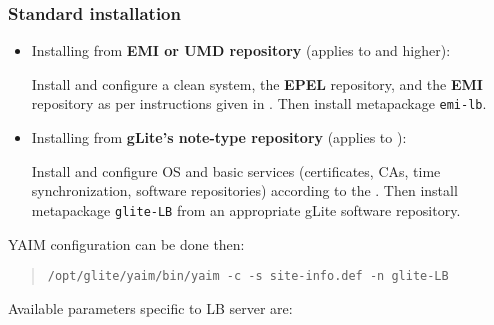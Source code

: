 \subsubsection{Standard installation}

\begin{itemize}
\item Installing from \textbf{EMI or UMD repository} (applies to  and higher):

Install and configure a clean system, the \textbf{EPEL} repository, and the \textbf{EMI} repository as per instructions given in . Then install metapackage \texttt{emi-lb}.

\item Installing from \textbf{gLite's note-type repository} (applies to ):

Install and configure OS and basic services (certificates, CAs, time synchronization, software repositories) according to the . Then install metapackage \texttt{glite-LB} from an appropriate gLite software repository.

\end{itemize}

YAIM configuration can be done then:

\begin{quote}
\texttt{/opt/glite/yaim/bin/yaim -c -s site-info.def -n glite-LB}
\end{quote}

Available parameters specific to LB server are:

